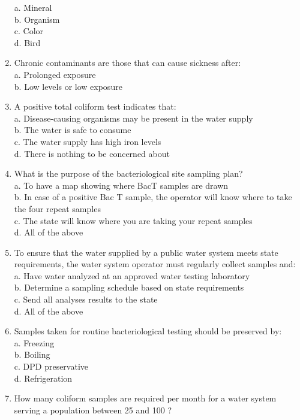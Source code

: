 \begin{enumerate}[1.]
a. Mineral\\
b. Organism\\
c. Color\\
d. Bird\\
\item Chronic contaminants are those that can cause sickness after:\\
a. Prolonged exposure\\
b. Low levels or low exposure\\
\item A positive total coliform test indicates that:\\
a. Disease-causing organisms may be present in the water supply\\
b. The water is safe to consume\\
c. The water supply has high iron levels\\
d. There is nothing to be concerned about\\
\item What is the purpose of the bacteriological site sampling plan?\\
a. To have a map showing where BacT samples are drawn\\
b. In case of a positive Bac $\mathrm{T}$ sample, the operator will know where to take the four repeat samples\\
c. The state will know where you are taking your repeat samples\\
d. All of the above\\
\item To ensure that the water supplied by a public water system meets state requirements, the water system operator must regularly collect samples and:\\
a. Have water analyzed at an approved water testing laboratory\\
b. Determine a sampling schedule based on state requirements\\
c. Send all analyses results to the state\\
d. All of the above\\
\item Samples taken for routine bacteriological testing should be preserved by:\\
a. Freezing\\
b. Boiling\\
c. DPD preservative\\
d. Refrigeration\\
\item How many coliform samples are required per month for a water system serving a population between 25 and 100 ?\\

\end{enumerate}

